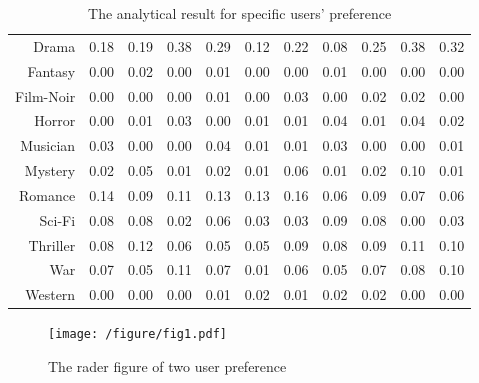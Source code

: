 \begin{table}
\begin{tabular}{rrrrrrrrrrr}
     Drama &      0.18  &      0.19  &      0.38  &      0.29  &      0.12  &      0.22  &      0.08  &      0.25  &      0.38  &      0.32  \\

   Fantasy &      0.00  &      0.02  &      0.00  &      0.01  &      0.00  &      0.00  &      0.01  &      0.00  &      0.00  &      0.00  \\

 Film-Noir &      0.00  &      0.00  &      0.00  &      0.01  &      0.00  &      0.03  &      0.00  &      0.02  &      0.02  &      0.00  \\

    Horror &      0.00  &      0.01  &      0.03  &      0.00  &      0.01  &      0.01  &      0.04  &      0.01  &      0.04  &      0.02  \\

  Musician &      0.03  &      0.00  &      0.00  &      0.04  &      0.01  &      0.01  &      0.03  &      0.00  &      0.00  &      0.01  \\

   Mystery &      0.02  &      0.05  &      0.01  &      0.02  &      0.01  &      0.06  &      0.01  &      0.02  &      0.10  &      0.01  \\

   Romance &      0.14  &      0.09  &      0.11  &      0.13  &      0.13  &      0.16  &      0.06  &      0.09  &      0.07  &      0.06  \\

    Sci-Fi &      0.08  &      0.08  &      0.02  &      0.06  &      0.03  &      0.03  &      0.09  &      0.08  &      0.00  &      0.03  \\

  Thriller &      0.08  &      0.12  &      0.06  &      0.05  &      0.05  &      0.09  &      0.08  &      0.09  &      0.11  &      0.10  \\

       War &      0.07  &      0.05  &      0.11  &      0.07  &      0.01  &      0.06  &      0.05  &      0.07  &      0.08  &      0.10  \\

   Western &      0.00  &      0.00  &      0.00  &      0.01  &      0.02  &      0.01  &      0.02  &      0.02  &      0.00  &      0.00  \\

\end{tabular}
\caption{The analytical result for specific users' preference}  
\end{table}
\begin{figure}[htbp]
\centering
\texttt{[image: /figure/fig1.pdf]}
\caption{The rader figure of two user preference} \label{fig:1}
\end{figure}

